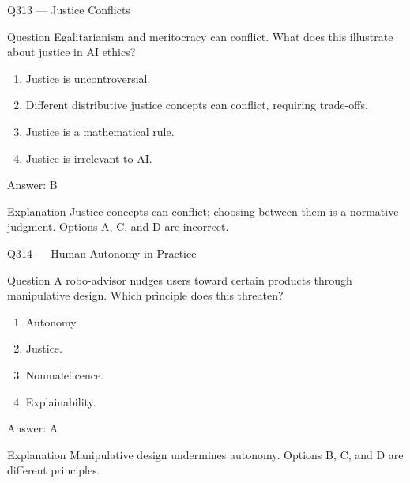 \documentclass[aspectratio=169,8pt]{beamer}
\begin{document}
\begin{frame}{Q313 --- Justice Conflicts}
	\begin{block}{Question}
		Egalitarianism and meritocracy can conflict. What does this illustrate about justice in AI ethics?
		\begin{enumerate}
			\item Justice is uncontroversial.
			\item Different distributive justice concepts can conflict, requiring trade-offs.
			\item Justice is a mathematical rule.
			\item Justice is irrelevant to AI.
	\end{enumerate}  \end{block}
	\begin{exampleblock}{Answer: B}\end{exampleblock}
	\begin{block}{Explanation}
		Justice concepts can conflict; choosing between them is a normative judgment. Options A, C, and D are incorrect.
	\end{block}
\end{frame}

\begin{frame}{Q314 --- Human Autonomy in Practice}
	\begin{block}{Question}
		A robo-advisor nudges users toward certain products through manipulative design. Which principle does this threaten?
		\begin{enumerate}
			\item Autonomy.
			\item Justice.
			\item Nonmaleficence.
			\item Explainability.
	\end{enumerate}  \end{block}
	\begin{exampleblock}{Answer: A}\end{exampleblock}
	\begin{block}{Explanation}
		Manipulative design undermines autonomy. Options B, C, and D are different principles.
	\end{block}
\end{frame}
\end{document}
